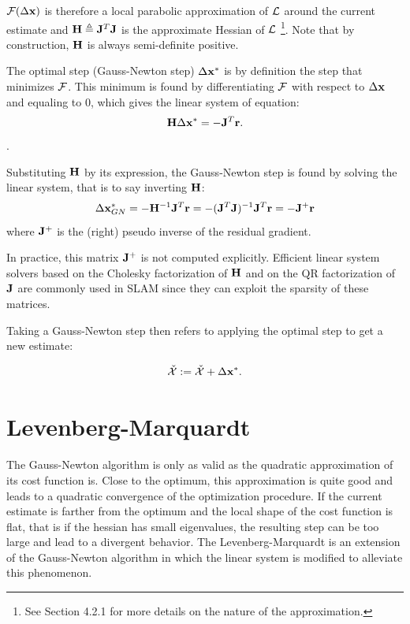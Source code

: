$\mathcal{F}(\Delta {\bf x})$ is therefore a local parabolic approximation of 
$\mathcal{L}$ around the current estimate and ${\bf H} \triangleq {\bf J}^T {\bf J}$ is the approximate Hessian of $\mathcal{L}$ 
\footnote{See \cite{sola2017course} Section 4.2.1 for more details on the nature of the approximation.}. Note that by construction, ${\bf H}$ is always 
semi-definite positive.


The optimal step (Gauss-Newton step) $\Delta {\bf x}^*$ is by definition the step that minimizes $\mathcal{F}$. This minimum is found by differentiating $\mathcal{F}$ with respect to $\Delta {\bf x}$ and equaling to 0,
which gives the linear system of equation:
\begin{equation}
    \bfH \Delta \bfx^* = - \bfJ^T \bfr.%
    \label{eq:linear_syst_GN}
\end{equation}.

Substituting ${\bf H}$ by its expression, the Gauss-Newton step is found by solving the linear system, that is to say inverting ${\bf H}$:
%
\begin{equation*}
    \Delta {\bf x}_{GN}^* = - {\bf H}^{-1} {\bf J}^T {\bf r} = - ({\bf J}^T {\bf J})^{-1} {\bf J}^T {\bf r} = -  {\bf J}^{+} {\bf r}
\end{equation*}
%
where ${\bf J}^{+}$ is the (right) pseudo inverse of the residual gradient. 

In practice, this matrix ${\bf J}^{+}$ is not computed explicitly. Efficient linear system solvers based on the Cholesky
factorization of ${\bf H}$ and on the QR factorization of ${\bf J}$ are commonly used in SLAM since they can exploit the sparsity of these
matrices.

Taking a Gauss-Newton step then refers to applying the optimal step to get a new estimate:

\begin{equation}
    \check{\mathcal{X}} := \check{\mathcal{X}} + \Delta {\bf x}^*.
    \label{eq:gaussian_step}
\end{equation}



\section{Levenberg-Marquardt}
The Gauss-Newton algorithm is only as valid as the quadratic approximation of its cost function is. Close to the optimum, this approximation
is quite good and leads to a quadratic convergence of the optimization procedure. If the current estimate is farther from the optimum and the
local shape of the cost function is flat, that is if the hessian has small eigenvalues, the resulting step can be too large and lead to a 
divergent behavior. The Levenberg-Marquardt is an extension of the Gauss-Newton algorithm in which the linear system  is modified
to alleviate this phenomenon.



